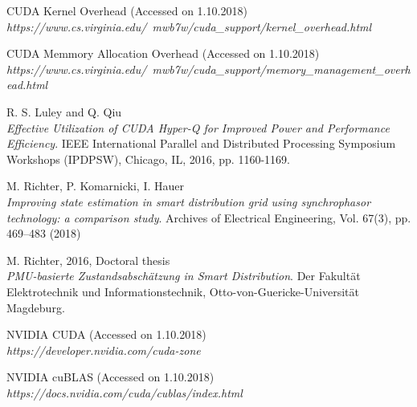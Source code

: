 \documentclass[fontsize=12pt, paper=a4, headinclude, twoside=false, parskip=half+, pagesize=auto, numbers=noenddot, headsepline, footsepline, open=right, toc=listof, toc=bibliography]{scrreprt}
\begin{document}
\begin{thebibliography}{9}
	CUDA Kernel Overhead (Accessed on 1.10.2018)
	\\\textit{https://www.cs.virginia.edu/~mwb7w/cuda\_support/kernel\_overhead.html}
	
	
	CUDA Memmory Allocation Overhead (Accessed on 1.10.2018)
	\\\textit{https://www.cs.virginia.edu/~mwb7w/cuda\_support/memory\_management\_overhead.html}
	
	
	R. S. Luley and Q. Qiu
	\\\textit{Effective Utilization of CUDA Hyper-Q for Improved Power and Performance Efficiency}.
	IEEE International Parallel and Distributed Processing Symposium Workshops (IPDPSW), Chicago, IL, 2016, pp. 1160-1169.
	
	M. Richter, P. Komarnicki, I. Hauer
	\\\textit{Improving state estimation in smart distribution grid
	using synchrophasor technology: a comparison study}.
	Archives of Electrical Engineering, Vol. 67(3), pp. 469–483 (2018)
	
	M. Richter, 2016, Doctoral thesis
	\\\textit{PMU-basierte Zustandsabschätzung in Smart Distribution}.
	Der Fakultät Elektrotechnik und Informationstechnik, Otto-von-Guericke-Universität Magdeburg.
	
	NVIDIA CUDA (Accessed on 1.10.2018)
	\\\textit{https://developer.nvidia.com/cuda-zone}
	
	
	NVIDIA cuBLAS (Accessed on 1.10.2018)
	\\\textit{https://docs.nvidia.com/cuda/cublas/index.html}
	
	
\end{thebibliography}
%



\end{document}
